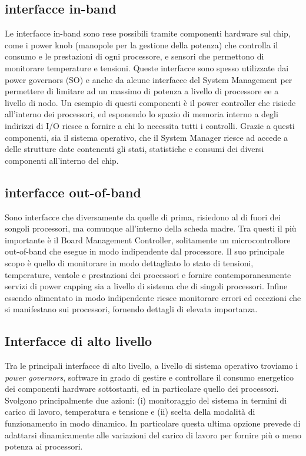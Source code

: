 
\subsection{interfacce in-band}
Le interfacce in-band sono rese possibili tramite componenti hardware sul chip, come i power knob (manopole per la gestione della potenza) che controlla il consumo e le prestazioni di ogni processore, e sensori che permettono di monitorare temperature e tensioni. Queste interfacce sono spesso utilizzate dai power governors (SO) e anche da alcune interfacce del System Management per permettere di limitare ad un massimo di potenza a livello di processore ee a livello di nodo. Un esempio di questi componenti è il power controller che risiede all'interno dei processori, ed esponendo lo spazio di memoria interno a degli indirizzi di I/O riesce a fornire a chi lo necessita tutti i controlli. Grazie a questi componenti, sia il sistema operativo, che il System Manager riesce ad accede a delle strutture date contenenti gli stati, statistiche e consumi dei diversi componenti all'interno del chip.

\subsection{interfacce out-of-band}
Sono interfacce che diversamente da quelle di prima, risiedono al di fuori dei songoli processori, ma comunque all'interno della scheda madre. Tra questi il più importante è il Board Management Controller, solitamente un microcontrollore out-of-band che esegue in modo indipendente dal processore. Il suo principale scopo è quello di monitorare in modo dettagliato lo stato di tensioni, temperature, ventole e prestazioni dei processori e fornire contemporaneamente servizi di power capping sia a livello di sistema che di singoli processori. Infine essendo alimentato in modo indipendente riesce monitorare errori ed eccezioni che si manifestano sui processori, fornendo dettagli di elevata importanza.

\subsection{Interfacce di alto livello}
Tra le principali interfacce di alto livello, a livello di sistema operativo troviamo i \emph{power governors}, software in grado di gestire e controllare il consumo energetico dei componenti hardware sottostanti, ed in particolare quello dei processori. Svolgono principalmente due azioni: (i) monitoraggio del sistema in termini di carico di lavoro, temperatura e tensione e (ii) scelta della modalità di funzionamento in modo dinamico. In particolare questa ultima opzione prevede di adattarsi dinamicamente alle variazioni del carico di lavoro per fornire più o meno potenza ai processori.

